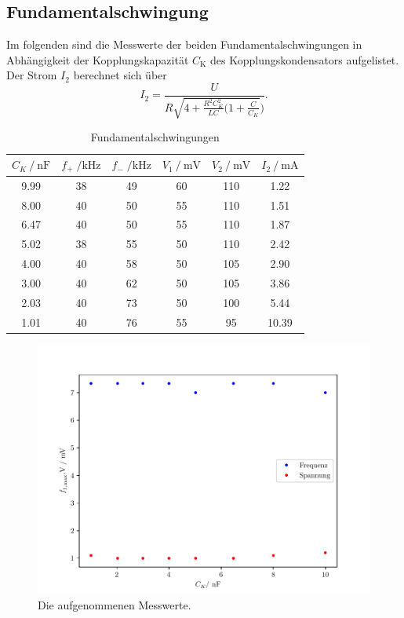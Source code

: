 \subsection{Fundamentalschwingung}
Im folgenden sind die Messwerte der beiden Fundamentalschwingungen in Abhängigkeit der Kopplungskapazität $C_{\text{K}}$ des Kopplungskondensators
aufgelistet. Der Strom $I_2$ berechnet sich über
\begin{equation}
  I_2  = \frac{U}{R\sqrt{4 + \frac{R^2C_K^2}{LC}(1 + \frac{C}{C_K}})}.
\end{equation}

\begin{table}[H]
  \centering
  \caption{Fundamentalschwingungen}
  \label{tab:aufgabeC}
  \begin{tabular}{c c c c c c}
      \toprule
      {$C_K \:/\: \si{\nano\farad}$} & {$f_+\;/ \si{\kilo\hertz}$} & {$f_-\;/ \si{\kilo\hertz}$} & {$V_1 \:/\: \si{\milli\volt}$} & {$V_2 \:/\: \si{\milli\volt}$} & $I_2 \:/\:\si{\milli\ampere}$ \\
      \midrule
      9.99 & 38 & 49 & 60 & 110 & 1.22 \\
      8.00 & 40 & 50 & 55 & 110 & 1.51 \\
      6.47 & 40 & 50 & 55 & 110 & 1.87 \\
      5.02 & 38 & 55 & 50 & 110 & 2.42 \\
      4.00 & 40 & 58 & 50 & 105 & 2.90 \\
      3.00 & 40 & 62 & 50 & 105 & 3.86 \\
      2.03 & 40 & 73 & 50 & 100 & 5.44 \\
      1.01 & 40 & 76 & 55 & 95 & 10.39 \\
      \bottomrule
  \end{tabular}
\end{table}


\begin{figure}[H]
  \centering
  \includegraphics{freq1.pdf}
  \caption{Die aufgenommenen Messwerte.}
  \label{fig:freq1}
\end{figure}

